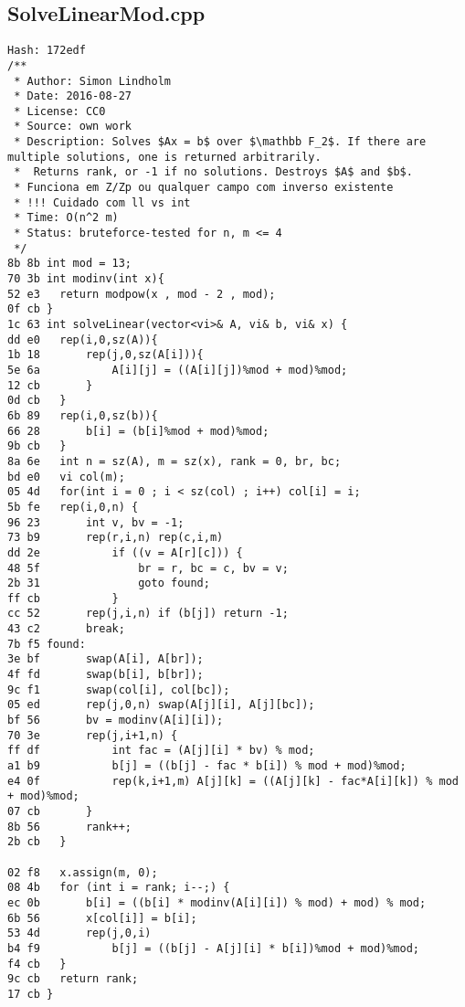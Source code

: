 \documentclass[11pt, a4paper, twoside]{article}
\begin{document}
\subsection{SolveLinearMod.cpp}
\begin{lstlisting}
Hash: 172edf
/**
 * Author: Simon Lindholm
 * Date: 2016-08-27
 * License: CC0
 * Source: own work
 * Description: Solves $Ax = b$ over $\mathbb F_2$. If there are multiple solutions, one is returned arbitrarily.
 *  Returns rank, or -1 if no solutions. Destroys $A$ and $b$.
 * Funciona em Z/Zp ou qualquer campo com inverso existente
 * !!! Cuidado com ll vs int
 * Time: O(n^2 m)
 * Status: bruteforce-tested for n, m <= 4
 */
8b 8b int mod = 13;
70 3b int modinv(int x){
52 e3 	return modpow(x , mod - 2 , mod);
0f cb }
1c 63 int solveLinear(vector<vi>& A, vi& b, vi& x) {
dd e0 	rep(i,0,sz(A)){
1b 18 		rep(j,0,sz(A[i])){
5e 6a 			A[i][j] = ((A[i][j])%mod + mod)%mod;
12 cb 		}
0d cb 	}
6b 89 	rep(i,0,sz(b)){
66 28 		b[i] = (b[i]%mod + mod)%mod;
9b cb 	}
8a 6e 	int n = sz(A), m = sz(x), rank = 0, br, bc;
bd e0 	vi col(m); 
05 4d 	for(int i = 0 ; i < sz(col) ; i++) col[i] = i;
5b fe 	rep(i,0,n) {
96 23 		int v, bv = -1;
73 b9 		rep(r,i,n) rep(c,i,m)
dd 2e 			if ((v = A[r][c])) {
48 5f 				br = r, bc = c, bv = v;
2b 31 				goto found;
ff cb 			}
cc 52 		rep(j,i,n) if (b[j]) return -1;
43 c2 		break;
7b f5 found:
3e bf 		swap(A[i], A[br]);
4f fd 		swap(b[i], b[br]);
9c f1 		swap(col[i], col[bc]);
05 ed 		rep(j,0,n) swap(A[j][i], A[j][bc]);
bf 56 		bv = modinv(A[i][i]);
70 3e 		rep(j,i+1,n) {
ff df 			int fac = (A[j][i] * bv) % mod;
a1 b9 			b[j] = ((b[j] - fac * b[i]) % mod + mod)%mod;
e4 0f 			rep(k,i+1,m) A[j][k] = ((A[j][k] - fac*A[i][k]) % mod + mod)%mod;
07 cb 		}
8b 56 		rank++;
2b cb 	}
      
02 f8 	x.assign(m, 0);
08 4b 	for (int i = rank; i--;) {
ec 0b 		b[i] = ((b[i] * modinv(A[i][i]) % mod) + mod) % mod;
6b 56 		x[col[i]] = b[i];
53 4d 		rep(j,0,i)
b4 f9 			b[j] = ((b[j] - A[j][i] * b[i])%mod + mod)%mod;
f4 cb 	}
9c cb 	return rank;
17 cb }
\end{lstlisting}
\end{document}
